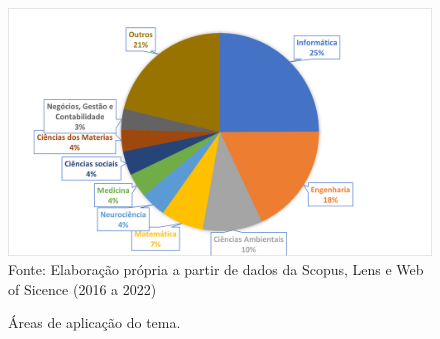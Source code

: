 \begin{figure}[H]
	\centering
	\caption{Áreas de aplicação do tema.}
	\label{fig:areas}
	\includegraphics[width=1\linewidth]{Revisao/Figuras/areas}
	\vspace{0.2cm}
Fonte: Elaboração própria a partir de dados da Scopus, Lens e Web of Sicence (2016 a 2022)
\end{figure}
